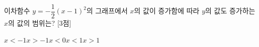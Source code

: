 이차함수 $y=-\dfrac{1}{2}(x-1)^2$의 그래프에서 $x$의 값이 증가함에 따라 $y$의 값도 증가하는 $x$의 값의 범위는? \mbox{[3점]}
\begin{choices32}{$x<-1$}{$x>-1$}{$x<0$}{$x<1$}{$x>1$}\end{choices32}
